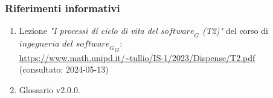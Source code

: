 \subsubsection{Riferimenti informativi}
\begin{enumerate}
    \item Lezione \emph{"I processi di ciclo di vita del $\textit{software}_G$ (T2)"} del corso di $\textit{ingegneria del $\textit{software}_G$}_G$: \\
    \url{https://www.math.unipd.it/~tullio/IS-1/2023/Dispense/T2.pdf}\\
    (consultato: 2024-05-13)
    \item Glossario v2.0.0.
\end{enumerate}